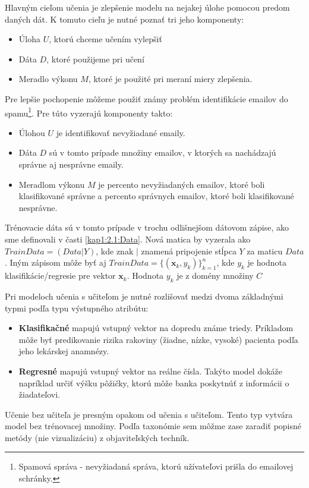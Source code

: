 Hlavným cieľom učenia je zlepšenie modelu na nejakej úlohe pomocou predom daných dát. K tomuto cieľu je nutné poznať tri jeho komponenty:
\begin{itemize}
\item Úloha $U$, ktorú chceme učením vylepšiť
\item Dáta $D$, ktoré použijeme pri učení
\item Meradlo výkonu $M$, ktoré je použité pri meraní miery zlepšenia.
\end{itemize} 
Pre lepšie pochopenie môžeme použiť známy problém identifikácie emailov do spamu\footnote{Spamová správa - nevyžiadaná správa, ktorú užívateľovi prišla do emailovej schránky.}. Pre túto vyzerajú komponenty takto:
\begin{itemize}
\item Úlohou $U$ je identifikovať nevyžiadané emaily.
\item Dáta $D$ sú v tomto prípade množiny emailov, v ktorých sa nachádzajú správne aj nesprávne emaily.
\item Meradlom výkonu $M$ je percento nevyžiadaných emailov, ktoré boli klasifikované správne a percento správnych emailov, ktoré boli klasifikované nesprávne.
\end{itemize} 

Trénovacie dáta sú v tomto prípade v trochu odlišnejšom dátovom zápise, ako sme definovali v časti \ref{kap1:2.1:Data}. Nová matica by vyzerala ako $TrainData = (Data | Y)$, kde znak $|$ znamená pripojenie stĺpca $Y$ za maticu $Data$. Iným zápisom môže byť aj $TrainData = \{(\mathbf{x}_{k},y_{k})\}_{k=1}^{n}$, kde $y_{k}$ je hodnota klasifikácie/regresie pre vektor $\mathbf{x}_{k}$. Hodnota $y_{k}$ je z domény množiny $C$ 

Pri modeloch učenia s učiteľom je nutné rozlišovať medzi dvoma základnými typmi podľa typu výstupného atribútu:
\begin{itemize}
\item \textbf{Klasifikačné} mapujú vstupný vektor na dopredu známe triedy. Príkladom môže byť predikovanie rizika rakoviny (žiadne, nízke, vysoké) pacienta podľa jeho lekárskej anamnézy.
\item \textbf{Regresné} mapujú vstupný vektor na reálne čísla. Takýto model dokáže napríklad určiť výšku pôžičky, ktorú môže banka poskytnúť z informácii o žiadateľovi.
\end{itemize} 

Učenie bez učiteľa je presným opakom od učenia s učiteľom. Tento typ vytvára model bez trénovacej množiny. Podľa taxonómie sem môžme zase zaradiť popisné metódy (nie vizualizáciu) z objaviteľských techník. 

